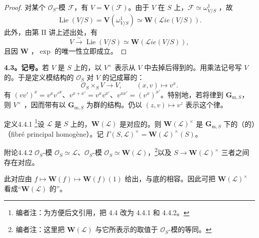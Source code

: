\begin{proof}
对某个 $\mathscr O_S$-模 $\mathscr F$，有 $V=\mathbf V(\mathscr F)$。由于 $V$ 在 $S$ 上，$\mathscr F\simeq\omega^1_{V/S}$ ，故
\[
\operatorname{Lie}(V/S)=\mathbf V(\omega^1_{V/S})\simeq\mathbf W(\mathscr{L}\!ie(V/S)).
\]
此外，由第 II 讲上述出处，有
\[
V\xrightarrow{\sim}\operatorname{Lie}(V/S)\simeq\mathbf W(\mathscr{L}\!ie(V/S)),
\]
且因 $\mathbf W$ ，$\exp$ 的唯一性立即成立。
\end{proof}
\textbf{4.3。记号。}若 $V$ 是 $S$ 上的，以 $V^\times$ 表示从 $V$ 中去掉后得到的。用乘法记号写 $V$ 的。于是定义模结构的 $\mathscr O_S$ 对 $V$ 的记成幂的：
\[
\mathscr O_S\mathbin{\times_S}V\longrightarrow V,\qquad(x,v)\longmapsto v^x.
\]
有 $(vv')^x=v^xv'^x$、$v^{x+x'}=v^xv^{x'}$、$v^{xx'}=(v^x)^{x'}$。特别地，若将律到 $\mathbf G_{\mathrm m,S}$，则 $V^\times$ ，因而带有以 $\mathbf G_{\mathrm m,S}$ 为群的结构。仍以 $(z,v)\mapsto v^z$ 表示这个律。
\begin{SGAresult}{定义}{4.4.1}
\footnote[32]{编者注：为方便后文引用，把 4.4 改为 4.4.1 和 4.4.2。}设 $\mathscr L$ 是 $S$ 上的，$\mathbf W(\mathscr L)$ 是对应的。则 $\mathbf W(\mathscr L)^\times$ 是 $\mathbf G_{\mathrm m,S}$ 下的（的）（fibré principal homogène）。记 $\Gamma(S,\mathscr L)^\times=\mathbf W(\mathscr L)^\times(S)$。
\end{SGAresult}
\begin{SGAresult}{附论}{4.4.2}
$\mathscr O_S$-模 $\mathscr O_S\simeq\mathscr L$、$\mathscr O_S$-模 $\mathscr O_S\simeq\mathbf W(\mathscr L)$，\footnote[33]{编者注：这里把 $\mathbf W(\mathscr L)$ 与它所表示的取值于 $\mathscr O_S$-模的等同。}以及 $S\to\mathbf W(\mathscr L)^\times$ 三者之间存在对应。

此对应由 $f\mapsto\mathbf W(f)\mapsto\mathbf W(f)(1)$ 给出，与底的相容。因此可把 $\mathbf W(\mathscr L)^\times$ 看成“$\mathbf W(\mathscr L)$ 的”。
\end{SGAresult}
